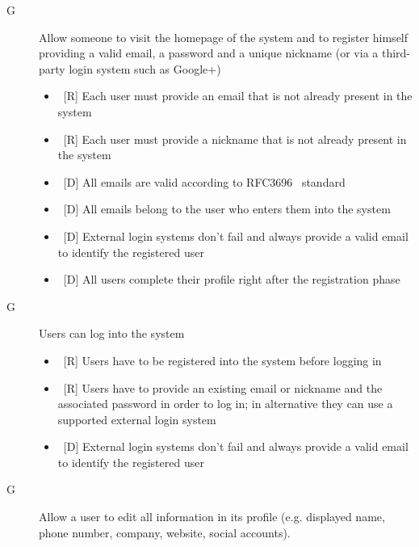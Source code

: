 \setcounter{countReq}{1}

\begin{description}
\item[G\thecountReq] Allow someone to visit the homepage of the system and to register himself providing a valid email, a password and a unique nickname (or via a third-party login system such as Google+)

\begin{itemize}
\item~[R] Each user must provide an email that is not already present in the system
\item~[R] Each user must provide a nickname that is not already present in the system
\end{itemize}

\begin{itemize}
\item~[D] All emails are valid according to RFC3696~\cite{RFC3696} standard
\item~[D] All emails belong to the user who enters them into the system
\item~[D] External login systems don’t fail and always provide a valid email to identify the registered user
\item~[D] All users complete their profile right after the registration phase
\end{itemize}

\item[G\thecountReq] Users can log into the system

\begin{itemize}
\item~[R] Users have to be registered into the system before logging in
\item~[R] Users have to provide an existing email or nickname and the associated password in order to log in; in alternative they can use a supported external login system
\end{itemize}

\begin{itemize}
\item~[D] External login systems don’t fail and always provide a valid email to identify the registered user
\end{itemize}

\item[G\thecountReq] Allow a user to edit all information in its profile (e.g. displayed name, phone number, company, website, social accounts).


\end{description}
